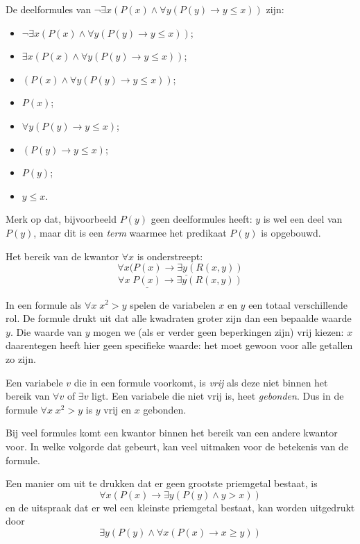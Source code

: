 \begin{example}
De deelformules van $\neg\exists x(P(x)\wedge\forall y(P(y)\rightarrow y\leq x))$ zijn:
\begin{itemize}
    \item $\neg\exists x(P(x)\wedge\forall y(P(y)\rightarrow y\leq x))$;
    \item $\exists x(P(x)\wedge\forall y(P(y)\rightarrow y\leq x))$;
    \item $(P(x)\wedge\forall y(P(y)\rightarrow y\leq x))$;
    \item $P(x)$;
    \item $\forall y(P(y)\rightarrow y\leq x)$;
    \item $(P(y)\rightarrow y\leq x)$;
    \item $P(y)$;
    \item $y\leq x$.
\end{itemize}
Merk op dat, bijvoorbeeld $P(y)$ geen deelformules heeft: $y$ is wel een deel van $P(y)$, maar dit is een \textit{term} waarmee het predikaat $P(y)$ is opgebouwd.
\end{example}

\begin{example}
Het bereik van de kwantor $\forall x$ is onderstreept:
$$\forall x\underline{(P(x)\rightarrow\exists y(R(x,y))}$$
$$\forall x\;\underline{P(x)}\rightarrow\exists y(R(x,y))$$
\end{example}
In een formule als $\forall x\;x^2>y$ spelen de variabelen $x$ en $y$ een totaal verschillende rol. De formule drukt uit dat alle kwadraten groter zijn dan een bepaalde waarde $y$. Die waarde van $y$ mogen we (als er verder geen beperkingen zijn) vrij kiezen: $x$ daarentegen heeft hier geen specifieke waarde: het moet gewoon voor alle getallen zo zijn.

Een variabele $v$ die in een formule voorkomt, is \textit{vrij} als deze niet binnen het bereik van $\forall v$ of $\exists v$ ligt. Een variabele die niet vrij is, heet \textit{gebonden}. Dus in de formule $\forall x\;x^2>y$ is $y$ vrij en $x$ gebonden.

Bij veel formules komt een kwantor binnen het bereik van een andere kwantor voor. In welke volgorde dat gebeurt, kan veel uitmaken voor de betekenis van de formule.
\begin{example}
Een manier om uit te drukken dat er geen grootste priemgetal bestaat, is
$$\forall x(P(x)\rightarrow\exists y(P(y)\wedge y>x))$$
en de uitspraak dat er wel een kleinste priemgetal bestaat, kan worden uitgedrukt door
$$\exists y(P(y)\wedge\forall x(P(x)\rightarrow x\geq y))$$
\end{example}

